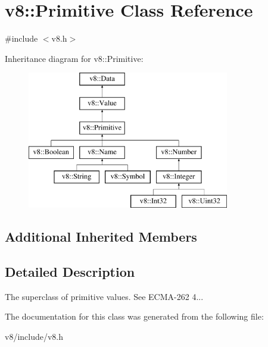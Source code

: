 \hypertarget{classv8_1_1Primitive}{}\section{v8\+:\+:Primitive Class Reference}
\label{classv8_1_1Primitive}


{\ttfamily \#include $<$v8.\+h$>$}

Inheritance diagram for v8\+:\+:Primitive\+:\begin{figure}[H]
\begin{center}
\leavevmode
\includegraphics[height=6.000000cm]{classv8_1_1Primitive}
\end{center}
\end{figure}
\subsection*{Additional Inherited Members}


\subsection{Detailed Description}
The superclass of primitive values. See E\+C\+M\+A-\/262 4... 

The documentation for this class was generated from the following file\+:\begin{DoxyCompactItemize}
\item 
v8/include/v8.\+h\end{DoxyCompactItemize}
